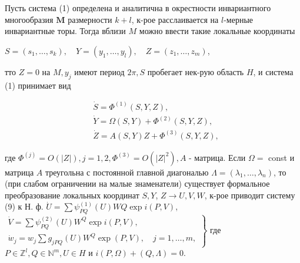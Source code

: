 \documentclass[10pt]{article}
\begin{document}
Пусть система (1) определена и аналитична в окрестности инвариантного многообразия $\boldsymbol{M}$ размерности $k+l$, к-рое расслаивается на $l$-мерные инвариантные торы. Тогда вблизи $M$ можно ввести такие локальные координаты



$S=\left(s_{1}, \ldots, s_{k}\right), \quad Y=\left(y_{1}, \ldots, y_{l}\right), \quad Z=\left(z_{1}, \ldots, z_{m}\right)$,



тто $Z=0$ на $M, y_{j}$ имеют период $2 \pi, S$ пробегает нек-рую область $H$, и система (1) принимает вид



\[

\begin{aligned}

& \dot{S}=\Phi^{(1)}(S, Y, Z), \\

& \dot{Y}=\Omega(S, Y)+\Phi^{(2)}(S, Y, Z), \\

& \dot{Z}=A(S, Y) Z+\Phi^{(3)}(S, Y, Z),

\end{aligned}

\]



где $\Phi^{(j)}=O(|Z|), j=1,2, \Phi^{(3)}=O\left(|Z|^{2}\right), A$ - матрица. Если $\Omega=$ const и матрица $A$ треугольна с постоянной главной диагональю $\Lambda=\left(\lambda_{1}, \ldots, \lambda_{n}\right)$, то (при слабом ограничении на малые знаменатели) существует формальное преобразование локальных координат $S, Y$, $Z \rightarrow U, V, W$, к-рое приводит систему (9) к Н. $ф$. $\dot{U}=\sum \psi_{P Q}^{(1)}(U) W Q \exp i(P, V)$, $\left.\begin{array}{l}\dot{V}=\sum \psi_{P Q}^{(2)}(U) W^{Q} \exp i(P, V), \\ \dot{w}_{j}=w_{j} \sum g_{j P Q}(U) W^{Q} \exp (P, V), \quad j=1, \ldots, m,\end{array}\right\}$ где $P \in \mathbb{Z}^{l}, Q \in \mathbb{N}^{m}, U \in H$ и $i(P, \Omega)+(Q, \Lambda)=0$.
\end{document}
